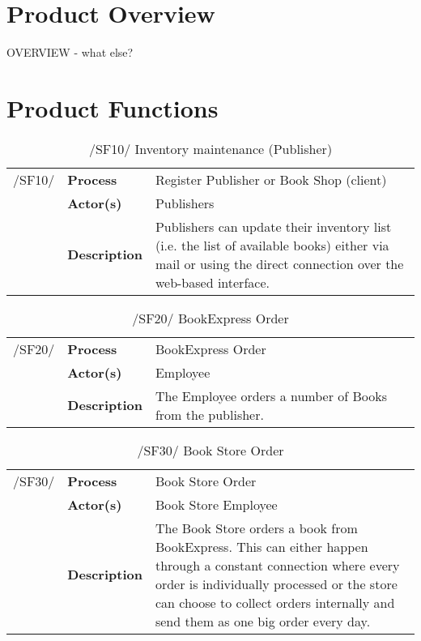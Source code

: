 \documentclass[11pt,a4paper,oneside,svgnames]{report}
\begin{document}
\chapter{Product Overview}
OVERVIEW - what else?
\\
\chapter{Product Functions}

\begin{table}[H]
\centering
\begin{tabular}{p{1.5cm}p{3cm}p{8cm}}
\cellcolor{white}/SF10/	& \textbf{Process}	& Register Publisher or Book Shop (client)\\
\cellcolor{white}		& \textbf{Actor(s)} & Publishers \\
\cellcolor{white}		& \textbf{Description}	 & Publishers can update their inventory list (i.e. the list of available books) either via mail or using the direct connection over the web-based interface. \\
\end{tabular}
\caption{/SF10/ Inventory maintenance (Publisher)}
\end{table}

\begin{table}[H]
\centering
\begin{tabular}{p{1.5cm}p{3cm}p{8cm}}
\cellcolor{white}/SF20/	& \textbf{Process}	& BookExpress Order \\
\cellcolor{white}		& \textbf{Actor(s)} & Employee \\
\cellcolor{white}		& \textbf{Description}	 &  The Employee orders a number of Books from the publisher.\\
\end{tabular}
\caption{/SF20/ BookExpress Order}
\end{table}

\begin{table}[H]
\centering
\begin{tabular}{p{1.5cm}p{3cm}p{8cm}}
\cellcolor{white}/SF30/	& \textbf{Process}	& Book Store Order \\
\cellcolor{white}		& \textbf{Actor(s)} &  Book Store Employee \\
\cellcolor{white}		& \textbf{Description}	 &  The Book Store orders a book from BookExpress. This can either happen through a constant connection where every order is individually processed or the store can choose to collect orders internally and send them as one big order every day. \\
\end{tabular}
\caption{/SF30/ Book Store Order}
\end{table}
\end{document}
